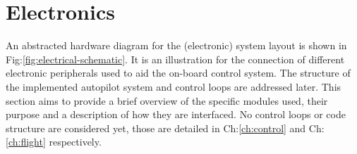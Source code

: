 \section{Electronics}
\label{sec:proto.layout}
{\centering
\vspace{-20pt}
\begin{minipage}{\textwidth}
\centering
{}
\end{minipage}
\vspace{-10pt}
\label{fig:electrical-schematic}
}
\newpage
An abstracted hardware diagram for the (electronic) system layout is shown in Fig:\ref{fig:electrical-schematic}. It is an illustration for the connection of different electronic peripherals used to aid the on-board control system. The structure of the implemented autopilot system and control loops are addressed later. This section aims to provide a brief overview of the specific modules used, their purpose and a description of how they are interfaced. No control loops or code structure are considered yet, those are detailed in Ch:\ref{ch:control} and Ch:\ref{ch:flight} respectively.
